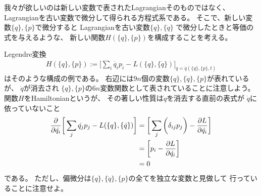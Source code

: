 我々が欲しいのは新しい変数で表されたLagrangianそのものではなく、
Lagrangianを古い変数で微分して得られる方程式系である。
そこで、新しい変数$\{q\},\{p\}$で微分すると
Lagrangianを古い変数$\{q\}, \{\dot{q}\}$
で微分したときと等価の式を与えるような、
新しい関数$H(\{q\},\{p\})$を構成することを考える。

Legendre変換
\begin{align}
  H(\{q\},\{p\})
  :=
  \bigg[
    \sum_i 
      \dot{q_i} p_i
  - L(\{q\}, \{\dot{q}\})
  \bigg]_{\dot{q} = \dot{q}(\{q\},\{p\},t)}
\end{align}
はそのような構成の例である。
右辺には$9n$個の変数$\{q\},\{\dot{q}\},\{p\}$が表れているが、
$\dot{q}$が消去され
$\{q\},\{p\}$の$6n$変数関数として表されていることに注意しよう。
関数$H$をHamiltonianというが、
その著しい性質は$\dot{q}$を消去する直前の表式が
$\dot{q}$に依っていないこと
\begin{align}
  \dfrac{\partial}{\partial \dot{q_i}}
  \bigg[
    \sum_j
      \dot{q_j} p_j
  - L(\{q\}, \{\dot{q}\})
  \bigg]
  &=
  \bigg[
    \sum_j\bigg(
      \delta_{ij} p_j
    \bigg)
  - \dfrac{\partial L}{\partial \dot{q_i}}
  \bigg]
\notag\\&=
  \bigg[
    p_i
    - \dfrac{\partial L}{\partial \dot{q_i}}
  \bigg]
\notag\\
  &=0
\end{align}
である。
ただし、偏微分は$\{q\},\{\dot{q}\},\{p\}$の全てを独立な変数と見做して
行っていることに注意せよ。

